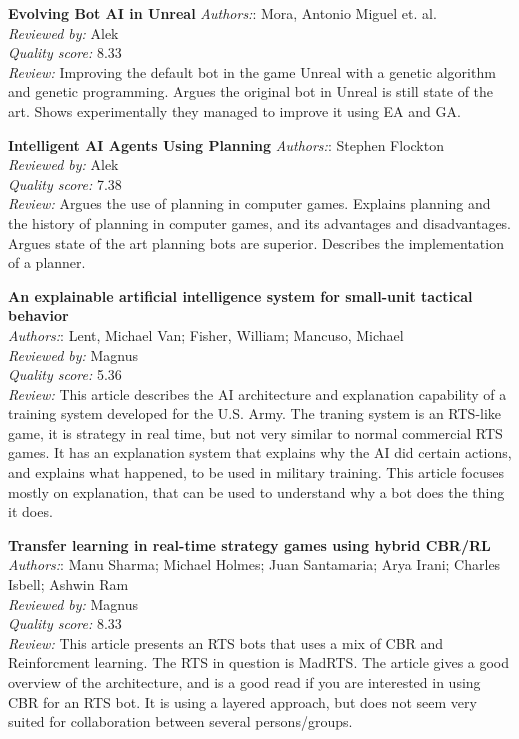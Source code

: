 \textbf{Evolving Bot AI in Unreal}
\textit{Authors:}: Mora, Antonio Miguel et. al.\\
\textit{Reviewed by:} Alek\\
\textit{Quality score:} 8.33\\
\textit{Review:} Improving the default bot in the game Unreal with a genetic algorithm and genetic programming. Argues the original bot in Unreal is still state of the art. Shows experimentally they managed to improve it using EA and GA.

\textbf{Intelligent AI Agents Using Planning}
\textit{Authors:}: Stephen Flockton\\
\textit{Reviewed by:} Alek\\
\textit{Quality score:} 7.38\\
\textit{Review:} Argues the use of planning in computer games. Explains planning and the history of planning in computer games, and its advantages and disadvantages. Argues state of the art planning bots are superior. Describes the implementation of a planner.

\textbf{An explainable artificial intelligence system for small-unit tactical behavior}\\
\textit{Authors:}: Lent, Michael Van; Fisher, William; Mancuso, Michael\\
\textit{Reviewed by:} Magnus\\
\textit{Quality score:} 5.36\\
\textit{Review:} This article describes the AI architecture and explanation capability of a training system developed for the U.S. Army. The traning system is an RTS-like game, it is strategy in real time, but not very similar to normal commercial RTS games. It has an explanation system that explains why the AI did certain actions, and explains what happened, to be used in military training. This article focuses mostly on explanation, that can be used to understand why a bot does the thing it does.

\textbf{Transfer learning in real-time strategy games using hybrid CBR/RL}\\
\textit{Authors:}: Manu Sharma; Michael Holmes; Juan Santamaria; Arya Irani; Charles Isbell; Ashwin Ram\\
\textit{Reviewed by:} Magnus\\
\textit{Quality score:} 8.33\\
\textit{Review:} This article presents an RTS bots that uses a mix of CBR and Reinforcment learning. The RTS in question is MadRTS. The article gives a good overview of the architecture, and is a good read if you are interested in using CBR for an RTS bot. It is using a layered approach, but does not seem very suited for collaboration between several persons/groups.

